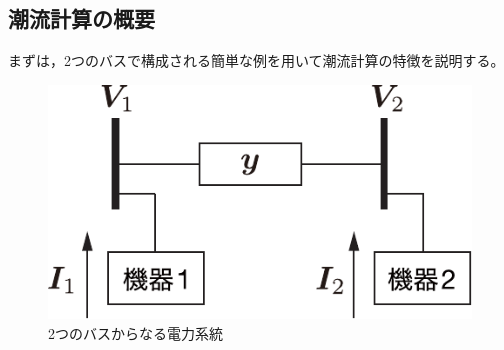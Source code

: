 \documentclass[tombow,dvipdfmx]{corona-a5-1.1}
\begin{document}
\subsection{潮流計算の概要}\label{sec:pfcal}

まずは，2つのバスで構成される簡単な例を用いて潮流計算の特徴を説明する。

\begin{figure}[t]
\centering
\includegraphics[width = .25\linewidth]{figs/2busex}
\caption{2つのバスからなる電力系統}
\label{fig:2buspf}
\end{figure}
\end{document}
